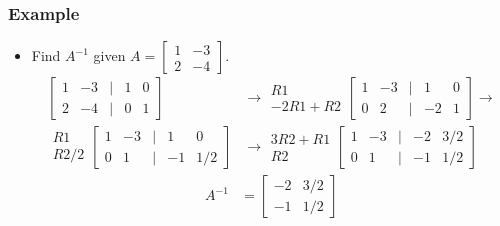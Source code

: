 \documentclass[14pt]{extarticle}
\begin{document}
\subsubsection{Example}
\begin{itemize}
	\item Find $A^{-1}$ given $A=\begin{bmatrix} 1 & -3 \\ 2 & -4	\end{bmatrix}$.
	\begin{align*}
		\begin{bmatrix}
			1 & -3 & | & 1 & 0 \\
			2 & -4 & | & 0 & 1
		\end{bmatrix} &\to
		\begin{array}{r}
			R1 \\
			-2R1 + R2
		\end{array}
		\begin{bmatrix}
			1 & -3 & | & 1 & 0 \\
			0 & 2 & | & -2 & 1
		\end{bmatrix} \to \\
		\begin{array}{r}
			R1 \\
			R2/2
		\end{array}
		\begin{bmatrix}
			1 & -3 & | & 1 & 0 \\
			0 & 1 & | & -1 & 1/2
		\end{bmatrix} &\to
		\begin{array}{r}
			3R2+R1 \\
			R2
		\end{array}
		\begin{bmatrix}
			1 & -3 & | & -2 & 3/2 \\
			0 & 1 & | & -1 & 1/2
		\end{bmatrix}
	\end{align*}
	\begin{align*}
		A^{-1} &= \begin{bmatrix} -2 & 3/2 \\ -1 & 1/2	\end{bmatrix}
	\end{align*}
\end{itemize}

\cleardoublepage
\end{document}
